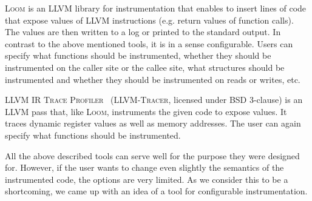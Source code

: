 \textsc{Loom} is an LLVM library for instrumentation that enables to insert
lines of code that expose values of LLVM instructions (e.g. return values of
function calls). The values are then written to a log or printed to the
standard output. In contrast to the above mentioned tools, it is in a sense
configurable. Users can specify what functions should be instrumented, whether
they should be instrumented on the caller site or the callee site, what
structures should be instrumented and whether they should be instrumented on
reads or writes, etc.

\textsc{LLVM IR Trace Profiler}~\cite{tracer} (\textsc{LLVM-Tracer}, licensed
under BSD 3-clause) is an LLVM pass that, like \textsc{Loom}, instruments the
given code to expose values. It traces dynamic register values as well as
memory addresses. The user can again specify what functions should be
instrumented. 

All the above described tools can serve well for the purpose they were designed
for. However, if the user wants to change even slightly the semantics of the
instrumented code, the options are very limited. As we consider this to be
a shortcoming, we came up with an idea of a tool for configurable
instrumentation.
